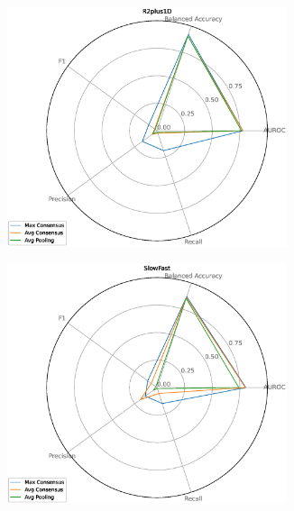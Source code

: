 \begin{figure}[htbp!]
    \centering
    \begin{subfigure}{.33\textwidth}
        \centering
        \includegraphics[width=0.9\textwidth, keepaspectratio, interpolate]{img/07_consensus_R2plus1D.eps}
    \end{subfigure}%
    \begin{subfigure}{.33\textwidth}
        \centering
        \includegraphics[width=0.9\textwidth, keepaspectratio, interpolate]{img/07_consensus_SlowFast.eps}
    \end{subfigure}%
    \begin{subfigure}{.33\textwidth}

\end{subfigure}
\end{figure}

